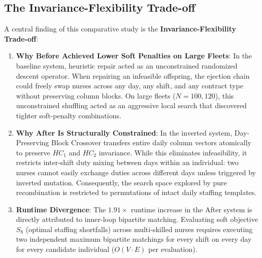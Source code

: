 \documentclass[10pt,journal,compsoc]{IEEEtran}
\begin{document}
\subsection{The Invariance-Flexibility Trade-off}
A central finding of this comparative study is the \textbf{Invariance-Flexibility Trade-off}:
\begin{enumerate}
    \item \textbf{Why Before Achieved Lower Soft Penalties on Large Fleets}: In the baseline system, heuristic repair acted as an unconstrained randomized descent operator. When repairing an infeasible offspring, the ejection chain could freely swap nurses across any day, any shift, and any contract type without preserving column blocks. On large fleets ($N = 100, 120$), this unconstrained shuffling acted as an aggressive local search that discovered tighter soft-penalty combinations.
    \item \textbf{Why After Is Structurally Constrained}: In the inverted system, Day-Preserving Block Crossover transfers entire daily column vectors atomically to preserve $HC_1$ and $HC_2$ invariance. While this eliminates infeasibility, it restricts inter-shift duty mixing between days within an individual: two nurses cannot easily exchange duties across different days unless triggered by inverted mutation. Consequently, the search space explored by pure recombination is restricted to permutations of intact daily staffing templates.
    \item \textbf{Runtime Divergence}: The $1.91\times$ runtime increase in the After system is directly attributed to inner-loop bipartite matching. Evaluating soft objective $S_8$ (optimal staffing shortfalls) across multi-skilled nurses requires executing two independent maximum bipartite matchings for every shift on every day for every candidate individual ($O(V \cdot E)$ per evaluation).
\end{enumerate}
\end{document}
